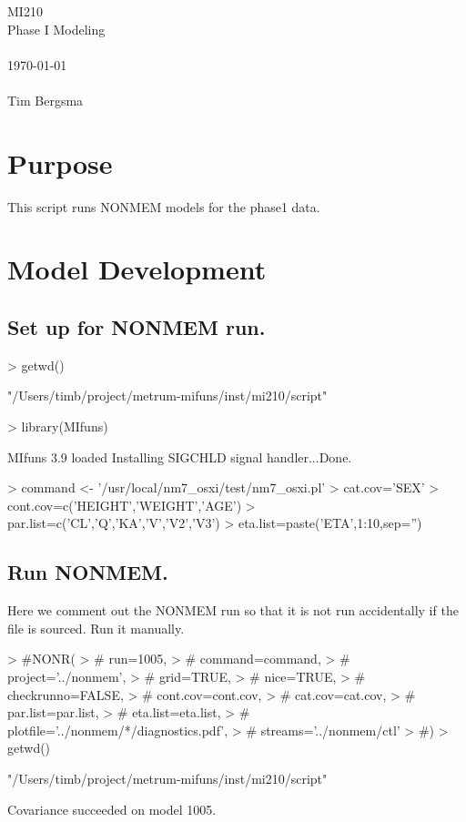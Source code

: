 
\usepackage{Sweave}

 

\vspace*{2cm}
\begin{center}
{\Huge MI210}\\
\vspace{1.5cm}
{\Large Phase I Modeling}\\
~\\
\today\\
~\\
Tim Bergsma\\
\end{center}
\newpage

\section{Purpose}
This script runs NONMEM models for the phase1 data.
\section{Model Development}
\subsection{Set up for NONMEM run.}
\begin{Schunk}
\begin{Sinput}
> getwd()
\end{Sinput}
\begin{Soutput}
[1] "/Users/timb/project/metrum-mifuns/inst/mi210/script"
\end{Soutput}
\begin{Sinput}
> library(MIfuns)
\end{Sinput}
\begin{Soutput}
MIfuns 3.9 loaded
Installing SIGCHLD signal handler...Done.
\end{Soutput}
\begin{Sinput}
> command <- '/usr/local/nm7_osxi/test/nm7_osxi.pl'
> cat.cov='SEX'
> cont.cov=c('HEIGHT','WEIGHT','AGE')
> par.list=c('CL','Q','KA','V','V2','V3')
> eta.list=paste('ETA',1:10,sep='')
\end{Sinput}
\end{Schunk}
\subsection{Run NONMEM.}
Here we comment out the NONMEM run so that it is not run accidentally 
if the file is sourced.  Run it manually.
\begin{Schunk}
\begin{Sinput}
> #NONR(
> #     run=1005,
> #     command=command,
> #     project='../nonmem',
> #     grid=TRUE,
> #     nice=TRUE,
> #     checkrunno=FALSE,
> #     cont.cov=cont.cov,
> #     cat.cov=cat.cov,
> #     par.list=par.list,
> #     eta.list=eta.list,
> #     plotfile='../nonmem/*/diagnostics.pdf',
> #     streams='../nonmem/ctl'
> #)
> getwd()
\end{Sinput}
\begin{Soutput}
[1] "/Users/timb/project/metrum-mifuns/inst/mi210/script"
\end{Soutput}
\end{Schunk}
Covariance succeeded on model 1005.
